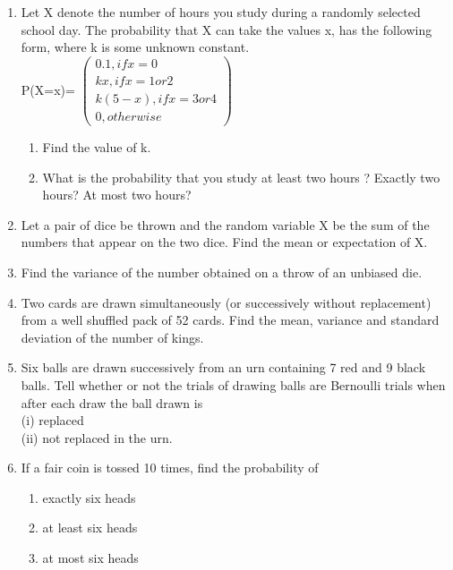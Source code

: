 \begin{enumerate}[label=\arabic*.,ref=\thesubsection.\theenumi]
\item Let X denote the number of hours you study during a randomly selected school day. The probability that X can take the values x, has the following form, where k is some unknown constant.\\
P(X=x)= $\begin{pmatrix} 0.1, if x= 0 \\ kx,if x= 1 or 2 \\ k(5-x), if x= 3 or 4 \\ 0, otherwise \end{pmatrix}$
\begin{enumerate}
\item  Find the value of k.
\item  What is the probability that you study at least two hours ? Exactly two hours? At
most two hours?
\end{enumerate}

\item Let a pair of dice be thrown and the random variable X be the sum of the numbers that appear on the two dice. Find the mean or expectation of X.\\

\item Find the variance of the number obtained on a throw of an unbiased die.\\

\item Two cards are drawn simultaneously (or successively without replacement) from a well shuffled pack of 52 cards. Find the mean, variance and standard deviation of the number of kings.\\

\item Six balls are drawn successively from an urn containing 7 red and 9 black balls. Tell whether or not the trials of drawing balls are Bernoulli trials when after each draw the ball drawn is\\
(i) replaced \\
(ii) not replaced in the urn.\\

\item If a fair coin is tossed 10 times, find the probability of
\begin{enumerate}
\item  exactly six heads
\item  at least six heads
\item  at most six  heads
\end{enumerate}
\solution



\end{enumerate}
